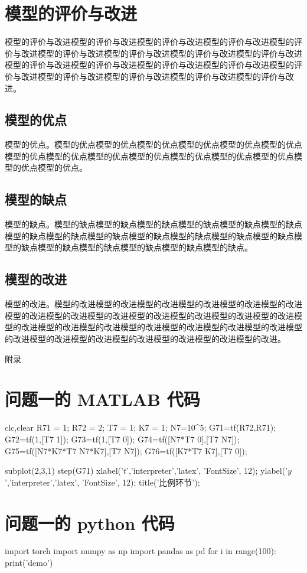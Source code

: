 \documentclass{MMCStyle}
\begin{document}
	\section{模型的评价与改进}
	模型的评价与改进模型的评价与改进模型的评价与改进模型的评价与改进模型的评价与改进模型的评价与改进模型的评价与改进模型的评价与改进模型的评价与改进模型的评价与改进模型的评价与改进模型的评价与改进模型的评价与改进模型的评价与改进模型的评价与改进模型的评价与改进模型的评价与改进模型的评价与改进。
 
	\subsection{模型的优点}
	模型的优点。模型的优点模型的优点模型的优点模型的优点模型的优点模型的优点模型的优点模型的优点模型的优点模型的优点模型的优点模型的优点模型的优点模型的优点模型的优点。
	\subsection{模型的缺点}
	模型的缺点。模型的缺点模型的缺点模型的缺点模型的缺点模型的缺点模型的缺点模型的缺点模型的缺点模型的缺点模型的缺点模型的缺点模型的缺点模型的缺点模型的缺点模型的缺点模型的缺点模型的缺点模型的缺点模型的缺点。
	\subsection{模型的改进}
	模型的改进。模型的改进模型的改进模型的改进模型的改进模型的改进模型的改进模型的改进模型的改进模型的改进模型的改进模型的改进模型的改进模型的改进模型的改进模型的改进模型的改进模型的改进模型的改进模型的改进模型的改进模型的改进模型的改进模型的改进模型的改进模型的改进模型的改进模型的改进。

	

	\newpage
	\appendix
	\begin{center}
		\heiti{} 附\hspace{1pc}录
	\end{center}
	\section{问题一的 MATLAB 代码}
	
 \begin{matlab}
    clc,clear
    R71 = 1;
    R72 = 2;
    T7 = 1;
    K7 = 1;
    N7=10^5;
    G71=tf(R72,R71);
    G72=tf(1,[T7 1]);
    G73=tf(1,[T7 0]);
    G74=tf([N7*T7 0],[T7 N7]);
    G75=tf([N7*K7*T7 N7*K7],[T7 N7]);
    G76=tf([K7*T7 K7],[T7 0]);
    
    subplot(2,3,1)
    step(G71)
    xlabel('$t$','interpreter','latex', 'FontSize', 12);
    ylabel('$y$','interpreter','latex', 'FontSize', 12);
    title('比例环节');
	
 \end{matlab}
 \section{问题一的 python 代码}
  \begin{python}
      import torch
      import numpy as np
      import pandas as pd
      for i in range(100):
          print('demo')
  \end{python}
\end{document}
